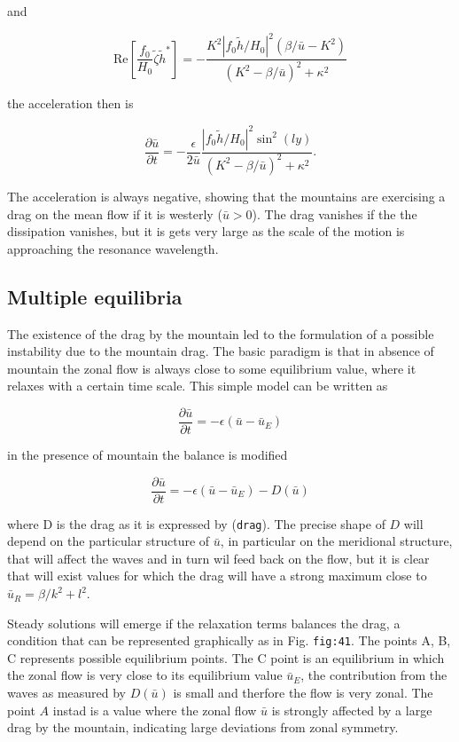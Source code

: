 and

\[\mathrm{Re}\left[ \frac{f_0}{H_0}\tilde{\zeta}\tilde{h}^*\right] = -\frac{K^2 |f_0 \tilde{h}/H_0|^2 ( \beta/\bar{u}-K^2)}{(K^2-\beta/\bar{u})^2  + \kappa^2}\]

the acceleration then is

{\[\frac{\partial \bar{u}}{\partial t} = -\frac{\epsilon}{2\bar{u}} \frac{ |f_0 \tilde{h}/H_0|^2 \sin^2(l y)}{(K^2-\beta/\bar{u})^2  + \kappa^2}.\]}

The acceleration is always negative, showing that the mountains are
exercising a drag on the mean flow if it is westerly (\(\bar{u}> 0\)).
The drag vanishes if the the dissipation vanishes, but it is gets very
large as the scale of the motion is approaching the resonance
wavelength.

\subsection{Multiple equilibria}\label{multiple-equilibria}

The existence of the drag by the mountain led to the formulation of a
possible instability due to the mountain drag. The basic paradigm is
that in absence of mountain the zonal flow is always close to some
equilibrium value, where it relaxes with a certain time scale. This
simple model can be written as

\[\frac{\partial \bar{u}}{\partial t} = -\epsilon(\bar{u}-\bar{u}_E)\]

in the presence of mountain the balance is modified

{\[\frac{\partial \bar{u}}{\partial t} = -\epsilon(\bar{u}-\bar{u}_E) -D(\bar{u})\]}

where D is the drag as it is expressed by (\texttt{drag}). The precise
shape of \(D\) will depend on the particular structure of \(\bar{u}\),
in particular on the meridional structure, that will affect the waves
and in turn wil feed back on the flow, but it is clear that will exist
values for which the drag will have a strong maximum close to
\(\bar{u}_R = \beta/k^2 +l^2\).

Steady solutions will emerge if the relaxation terms balances the drag,
a condition that can be represented graphically as in Fig.
\texttt{fig:41}. The points A, B, C represents possible equilibrium
points. The C point is an equilibrium in which the zonal flow is very
close to its equilibrium value \(\bar{u}_E\), the contribution from the
waves as measured by \(D(\bar{u})\) is small and therfore the flow is
very zonal. The point \(A\) instad is a value where the zonal flow
\(\bar{u}\) is strongly affected by a large drag by the mountain,
indicating large deviations from zonal symmetry.

